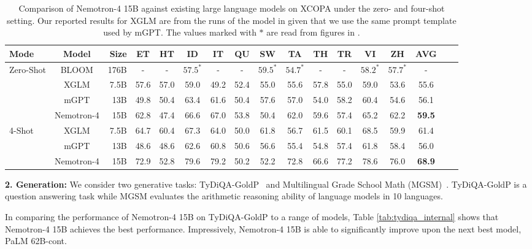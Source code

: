 \documentclass[11pt]{article}
\newcommand{\ours}{Nemotron-4}
\begin{document}
\begin{table}[H]
\centering
\begin{adjustbox}{max width=\textwidth, scale=1.0}
\begin{tabular}{lcrcccccccccccccc}
\toprule
Mode & Model & Size & ET & HT & ID & IT  & QU & SW & TA  & TH & TR & VI & ZH & AVG \\
\midrule
 \multirow{4}{*}{Zero-Shot} & BLOOM &   176B & - & - &  $57.5^*$ &	- &	 -  &	$59.5^*$ &	 $54.7^*$ &	- &	- &  $58.2^*$ &  $57.7^*$ & -     \\
 & XGLM & 7.5B & 57.6	& 57.0	& 59.0 &	49.2 &	52.4&	55.0 &	55.6	& 57.8& 	55.0 &	59.0 &	53.6 &	55.6 \\
 & mGPT &   13B & 49.8 &	50.4	& 63.4	& 61.6	& 50.4	& 57.6 &	57.0 & 54.0 &	58.2	& 60.4	& 54.6 & 56.1  \\
  & \ours{} & 15B & 62.8 & 47.4 & 66.6 & 67.0 & 53.8 & 50.4 & 62.0 & 59.6 & 57.4 & 65.2 & 62.2 & \textbf{59.5}   \\
  \midrule
\multirow{3}{*}{4-Shot} & XGLM &   7.5B & 64.7	&60.4	&67.3	& 64.0&	50.0&	61.8&	56.7&	61.5&	60.1 &	68.5 & 59.9	& 61.4   \\
 & mGPT & 13B & 48.6&	48.6	&62.6&	60.8&	50.6&	56.6&	55.4&	54.8&	57.4	&61.8&	58.4&56.0            \\
 & \ours{} & 15B & 72.9 & 52.8 & 79.6 & 79.2 & 50.2 & 52.2 & 72.8 & 66.6 & 77.2 & 78.6 & 76.0 & \textbf{68.9}  \\
\bottomrule
\end{tabular}
\end{adjustbox}
\caption{\label{tab:xcopa} Comparison of \ours{} 15B against existing large language models on XCOPA under the zero- and four-shot setting. Our reported results for XGLM are from the runs of the model in \citep{shliazhko2022mgpt} given that we use the same prompt template used by mGPT. The values marked with $*$ are read from figures in \citep{workshop2023bloom}. 
}
\end{table}

\textbf{2. Generation:} We consider two generative tasks: TyDiQA-GoldP~\citep{tydiqa} and Multilingual Grade School Math (MGSM)~\citep{shi2022language}. TyDiQA-GoldP is a question answering task while MGSM evaluates the arithmetic reasoning ability of language models in 10 languages.

In comparing the performance of \ours{} 15B on TyDiQA-GoldP to a range of models, Table \ref{tab:tydiqa_internal} shows that \ours{} 15B achieves the best performance. Impressively, \ours{} 15B is able to significantly improve upon the next best model, PaLM 62B-cont. 
\end{document}
